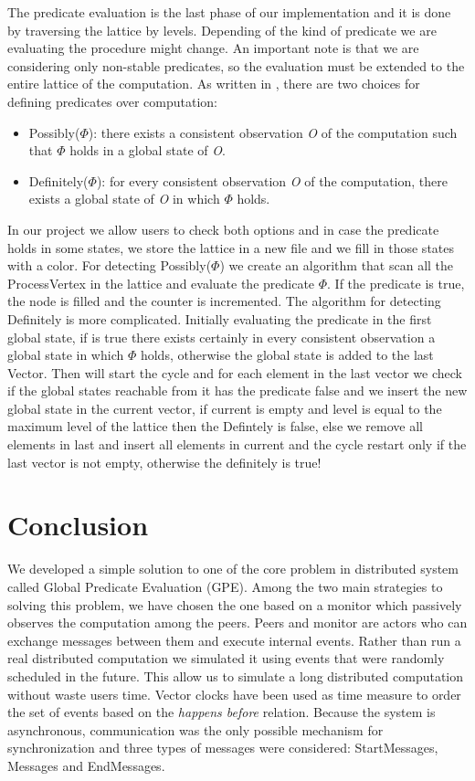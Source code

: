 \documentclass[11pt]{article}
\begin{document}
The predicate evaluation is the last phase of our implementation and it is done by traversing the lattice by levels. Depending of the kind of predicate we are evaluating the procedure might change. An important note is that we are considering only non-stable predicates, so the evaluation must be extended to the entire lattice of the computation. As written in \cite{Babaoglu}, there are two choices for defining predicates over computation:
\begin{itemize}
\item Possibly($\Phi$): there exists a consistent observation \textit{O} of the computation such that $\Phi$ holds in a global state of \textit{O}.
\item Definitely($\Phi$): for every consistent observation \textit{O} of the computation, there exists a global state of \textit{O} in which $\Phi$ holds.
\end{itemize}
In our project we allow users to check both options and in case the predicate holds in some states, we store the lattice in a new file and we fill in those states with a color.
For detecting Possibly($\Phi$) we create an algorithm that scan all the ProcessVertex in the lattice and evaluate the predicate $\Phi$. If the predicate is true, the node is filled and the counter is incremented.
The algorithm for detecting Definitely is more complicated. Initially evaluating the predicate in the first global state, if is true there exists certainly in every consistent observation a global state in which $\Phi$ holds, otherwise the global state is added to the last Vector. Then will start the cycle and for each element in the last vector we check if the global states reachable from it has the predicate false and we insert the new global state in the current vector, if current is empty and level is equal to the maximum level of the lattice then the Defintely is false, else we remove all elements in last and insert all elements in current and the cycle restart only if the last vector is not empty, otherwise the definitely is true!

\section{Conclusion}
We developed a simple solution to one of the core problem in distributed system called Global Predicate Evaluation (GPE). Among the two main strategies to solving this problem, we have chosen the one based on a monitor which passively observes the computation among the peers. Peers and monitor are actors who can exchange messages between them and execute internal events. Rather than run a real distributed computation we simulated it using events that were randomly scheduled in the future. This allow us to simulate a long distributed computation without waste users time. Vector clocks have been used as time measure to order the set of events based on the \textit{happens before} relation. Because the system is asynchronous, communication was the only possible mechanism for synchronization and three types of messages were considered: StartMessages, Messages and EndMessages.



\end{document}
